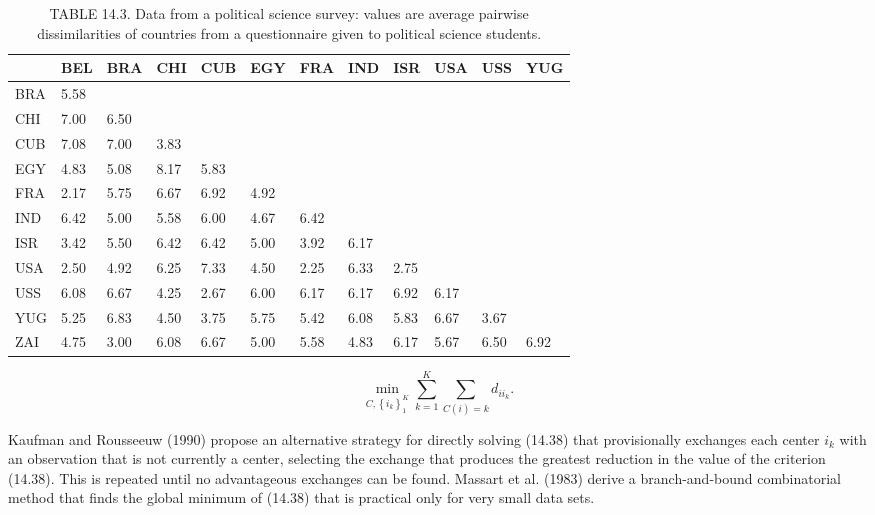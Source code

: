 \documentclass[10pt]{article}
\begin{document}
\begin{table}[h]
\begin{center}
\captionsetup{labelformat=empty}
\caption{TABLE 14.3. Data from a political science survey: values are average pairwise dissimilarities of countries from a questionnaire given to political science students.}
\begin{tabular}{|l|l|l|l|l|l|l|l|l|l|l|l|}
\hline
 & BEL & BRA & CHI & CUB & EGY & FRA & IND & ISR & USA & USS & YUG \\
\hline
BRA & 5.58 &  &  &  &  &  &  &  &  &  &  \\
\hline
CHI & 7.00 & 6.50 &  &  &  &  &  &  &  &  &  \\
\hline
CUB & 7.08 & 7.00 & 3.83 &  &  &  &  &  &  &  &  \\
\hline
EGY & 4.83 & 5.08 & 8.17 & 5.83 &  &  &  &  &  &  &  \\
\hline
FRA & 2.17 & 5.75 & 6.67 & 6.92 & 4.92 &  &  &  &  &  &  \\
\hline
IND & 6.42 & 5.00 & 5.58 & 6.00 & 4.67 & 6.42 &  &  &  &  &  \\
\hline
ISR & 3.42 & 5.50 & 6.42 & 6.42 & 5.00 & 3.92 & 6.17 &  &  &  &  \\
\hline
USA & 2.50 & 4.92 & 6.25 & 7.33 & 4.50 & 2.25 & 6.33 & 2.75 &  &  &  \\
\hline
USS & 6.08 & 6.67 & 4.25 & 2.67 & 6.00 & 6.17 & 6.17 & 6.92 & 6.17 &  &  \\
\hline
YUG & 5.25 & 6.83 & 4.50 & 3.75 & 5.75 & 5.42 & 6.08 & 5.83 & 6.67 & 3.67 &  \\
\hline
ZAI & 4.75 & 3.00 & 6.08 & 6.67 & 5.00 & 5.58 & 4.83 & 6.17 & 5.67 & 6.50 & 6.92 \\
\hline
\end{tabular}
\end{center}
\end{table}


\begin{equation*}
\min _{C,\left\{i_{k}\right\}_{1}^{K}} \sum_{k=1}^{K} \sum_{C(i)=k} d_{i i_{k}} . \tag{14.38}
\end{equation*}


Kaufman and Rousseeuw (1990) propose an alternative strategy for directly solving (14.38) that provisionally exchanges each center $i_{k}$ with an observation that is not currently a center, selecting the exchange that produces the greatest reduction in the value of the criterion (14.38). This is repeated until no advantageous exchanges can be found. Massart et al. (1983) derive a branch-and-bound combinatorial method that finds the global minimum of (14.38) that is practical only for very small data sets.
\end{document}
